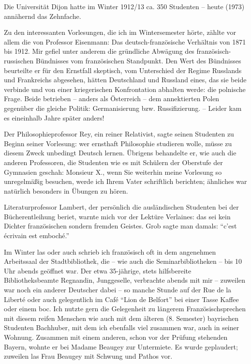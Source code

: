 Die Universität Dijon hatte im Winter 1912/13 ca. 350 Studenten -- heute (1973) annähernd das Zehnfache.

Zu den interessanten Vorlesungen, die ich im Wintersemester hörte, zählte vor allem die von Professor Eisenmann: Das deutsch-französische Verhältnis von 1871 bis 1912. Mir gefiel unter anderem die gründliche Abwägung des französisch-russischen Bündnisses vom französischen Standpunkt. Den Wert des Bündnisses beurteilte er für den Ernstfall skeptisch, vom Unterschied der Regime Russlands und Frankreichs abgesehen, hätten Deutschland und Russland eines, das sie beide verbinde und von einer kriegerischen Konfrontation abhalten werde: die polnische Frage. Beide betrieben -- anders als Österreich -- dem annektierten Polen gegenüber die gleiche Politik: Germanisierung bzw. Russifizierung. -- Leider kam es eineinhalb Jahre später anders!

Der Philosophieprofessor Rey, ein reiner Relativist, sagte seinen Studenten zu Beginn seiner Vorlesung: wer ernsthaft Philosophie studieren wolle, müsse zu diesem Zweck unbedingt Deutsch lernen. Übrigens behandelte er, wie auch die anderen Professoren, die Studenten wie es mit Schülern der Oberstufe der Gymnasien geschah: Monsieur X., wenn Sie weiterhin meine Vorlesung so unregelmäßig besuchen, werde ich Ihrem Vater schriftlich berichten; ähnliches war natürlich besonders in Übungen zu hören.

Literaturprofessor Lambert, der persönlich die ausländischen Studenten bei der Bücherentleihung beriet, warnte mich vor der Lektüre Verlaines: das sei kein Dichter französischen sondern fremden Geistes. Grob sagte man damals: \enquote{c'est écrivain est emboché.}

Im Winter las oder auch schrieb ich französisch oft in dem angenehmen Arbeitssaal der Stadtbibliothek, die -- wie auch die Seminarbibliotheken -- bis 10 Uhr abends geöffnet war. Der etwa 35-jährige, stets hilfsbereite Bibliotheksbeamte Regnandin, Junggeselle, verbrachte abends mit mir -- zuweilen war noch ein anderer Deutscher dabei -- so manche Stunde auf der Rue de la Liberté oder auch gelegentlich im Café \enquote{Lion de Belfort} bei einer Tasse Kaffee oder einem boc. Ich nutzte gern die Gelegenheit zu längerem Französischsprechen mit diesem reifen Menschen wie auch mit dem älteren (8. Semester) bayrischen Studenten Bachhuber, mit dem ich ebenfalls viel zusammen war, auch in seiner Wohnung. Zusammen mit einem anderen, schon vor der Prüfung stehenden Bayern, wohnte er bei Madame Beaugey zur Untermiete. Es wurde geplaudert; zuweilen las Frau Beaugey mit Schwung und Pathos vor.

